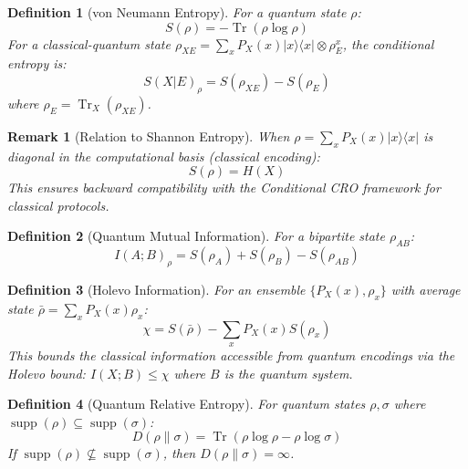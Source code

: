 \documentclass{ieeeaccess}
\newtheorem{definition}{Definition}[section]
\newtheorem{remark}{Remark}[section]
\begin{document}
\begin{definition}[von Neumann Entropy]
For a quantum state $\rho$:
\begin{equation}
    S(\rho) = -\operatorname{Tr}(\rho \log \rho)
\end{equation}
For a classical-quantum state $\rho_{XE} = \sum_x P_X(x) |x\rangle\langle x| \otimes \rho_E^x$, the conditional entropy is:
\begin{equation}
    S(X|E)_\rho = S(\rho_{XE}) - S(\rho_E)
\end{equation}
where $\rho_E = \operatorname{Tr}_X(\rho_{XE})$.
\end{definition}

\begin{remark}[Relation to Shannon Entropy]
When $\rho = \sum_x P_X(x) |x\rangle\langle x|$ is diagonal in the computational basis (classical encoding):
\begin{equation}
    S(\rho) = H(X)
\end{equation}
This ensures backward compatibility with the Conditional CRO framework for classical protocols.
\end{remark}

\begin{definition}[Quantum Mutual Information]
For a bipartite state $\rho_{AB}$:
\begin{equation}
    I(A; B)_\rho = S(\rho_A) + S(\rho_B) - S(\rho_{AB})
\end{equation}
\end{definition}

\begin{definition}[Holevo Information]
For an ensemble $\{P_X(x), \rho_x\}$ with average state $\bar{\rho} = \sum_x P_X(x) \rho_x$:
\begin{equation}
    χ = S(\bar{\rho}) - \sum_x P_X(x) S(\rho_x)
\end{equation}
This bounds the classical information accessible from quantum encodings via the Holevo bound: $I(X; B) \leq χ$ where $B$ is the quantum system.
\end{definition}

\begin{definition}[Quantum Relative Entropy]
For quantum states $\rho, \sigma$ where $\operatorname{supp}(\rho) \subseteq \operatorname{supp}(\sigma)$:
\begin{equation}
    D(\rho\|\sigma) = \operatorname{Tr}\left(\rho \log \rho - \rho \log \sigma\right)
\end{equation}
If $\operatorname{supp}(\rho) \not\subseteq \operatorname{supp}(\sigma)$, then $D(\rho\|\sigma) = \infty$.
\end{definition}
\end{document}
